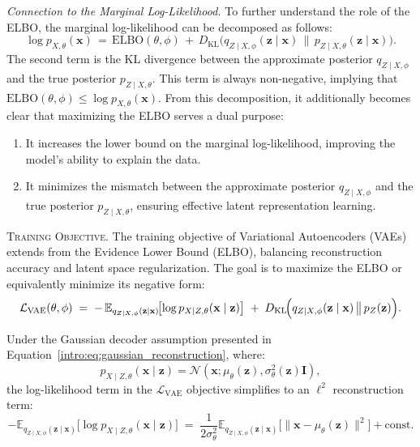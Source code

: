 \textit{Connection to the Marginal Log-Likelihood.} To further understand the role of the ELBO, the marginal log-likelihood can be decomposed as follows:
\[
\log p_{X,\theta}(\mathbf{x}) 
\,=\,
\mathrm{ELBO}(\theta, \phi)
\,+\,
D_{\mathrm{KL}}\big(q_{Z \mid X,\phi}(\mathbf{z} \mid \mathbf{x}) \,\|\, p_{Z \mid X,\theta}(\mathbf{z} \mid \mathbf{x})\big).
\]
The second term is the KL divergence between the approximate posterior \(q_{Z \mid X,\phi}\) and the true posterior \(p_{Z \mid X,\theta}\). This term is always non-negative, implying that \(\mathrm{ELBO}(\theta, \phi) \leq \log p_{X,\theta}(\mathbf{x})\). From this decomposition, it additionally becomes clear that maximizing the ELBO serves a dual purpose:
\begin{enumerate}
    \item It increases the lower bound on the marginal log-likelihood, improving the model's ability to explain the data.
    \item It minimizes the mismatch between the approximate posterior \(q_{Z \mid X,\phi}\) and the true posterior \(p_{Z \mid X,\theta}\), ensuring effective latent representation learning.
\end{enumerate}



\textsc{Training Objective.} The training objective of Variational Autoencoders (VAEs) extends from the Evidence Lower Bound (ELBO), balancing reconstruction accuracy and latent space regularization. The goal is to maximize the ELBO or equivalently minimize its negative form:
\[
\mathcal{L}_{\text{VAE}}(\theta, \phi)
\;=\;
-\,\mathbb{E}_{q_{Z \mid X,\phi}(\mathbf{z}\mid \mathbf{x})}\!
\bigl[\log p_{X \mid Z, \theta}(\mathbf{x}\mid \mathbf{z})\bigr]
\;+\;
D_{\mathrm{KL}}\!\Bigl(
    q_{Z \mid X,\phi}(\mathbf{z}\mid \mathbf{x})
    \,\bigl\|\,
    p_{Z}(\mathbf{z})
\Bigr).
\]

\noindent Under the Gaussian decoder assumption presented in Equation~\ref{intro:eq:gaussian_reconstruction}, where:
\[
p_{X \mid Z, \theta}(\mathbf{x} \mid \mathbf{z}) = \mathcal{N}(\mathbf{x}; \mu_\theta(\mathbf{z}), \sigma_\theta^2(\mathbf{z}) \mathbf{I}),
\]
the log-likelihood term in the \(\mathcal{L}_{\text{VAE}}\) objective simplifies to an \(\ell^2\) reconstruction term:
\[
-\mathbb{E}_{q_{Z \mid X, \phi}(\mathbf{z} \mid \mathbf{x})}
\bigl[\log p_{X \mid Z, \theta}(\mathbf{x} \mid \mathbf{z})\bigr]
\;=\;
\frac{1}{2\sigma_\theta^2}\mathbb{E}_{q_{Z \mid X, \phi}(\mathbf{z} \mid \mathbf{x})}
\bigl[\|\mathbf{x} - \mu_\theta(\mathbf{z})\|^2\bigr]
+ \text{const}.
\]

